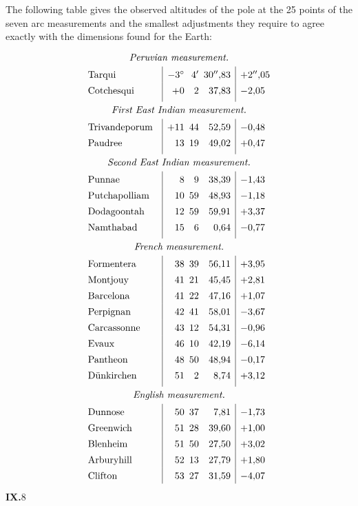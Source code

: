 The following table gives the observed altitudes of the pole at the 25 points
of the seven arc measurements and the smallest adjustments they require
to agree exactly with the dimensions found for the Earth:
\[
\renewcommand{\arraystretch}{1.38}
\begin{array}{@{}l@{\quad}|r@{\enspace}r@{\enspace}r|l@{}}
\multicolumn{5}{c}{\textit{Peruvian measurement.}}\\[.3ex]
\text{Tarqui}&-3^\circ&4'&30''{,}83&+2''{,}05\\
\text{Cotchesqui}&+0&2&37{,}83&-2{,}05\\[.8ex]
\multicolumn{5}{c}{\textit{First East Indian measurement.}}\\[.3ex]
\text{Trivandeporum}&+11&44&52{,}59&-0{,}48\\
\text{Paudree}&13&19&49{,}02&+0{,}47\\[.8ex]
\multicolumn{5}{c}{\textit{Second East Indian measurement.}}\\[.3ex]
\text{Punnae}&8&9&38{,}39&-1{,}43\\
\text{Putchapolliam}&10&59&48{,}93&-1{,}18\\
\text{Dodagoontah}&12&59&59{,}91&+3{,}37\\
\text{Namthabad}&15&6&0{,}64&-0{,}77\\[.8ex]
\multicolumn{5}{c}{\textit{French measurement.}}\\[.3ex]
\text{Formentera}&38&39&56{,}11&+3{,}95\\
\text{Montjouy}&41&21&45{,}45&+2{,}81\\
\text{Barcelona}&41&22&47{,}16&+1{,}07\\
\text{Perpignan}&42&41&58{,}01&-3{,}67\\
\text{Carcassonne}&43&12&54{,}31&-0{,}96\\
\text{Evaux}&46&10&42{,}19&-6{,}14\\
\text{Pantheon}&48&50&48{,}94&-0{,}17\\
\text{Dünkirchen}&51&2&8{,}74&+3{,}12\\[.8ex]
\multicolumn{5}{c}{\textit{English measurement.}}\\[.3ex]
\text{Dunnose}&50&37&7{,}81&-1{,}73\\
\text{Greenwich}&51&28&39{,}60&+1{,}00\\
\text{Blenheim}&51&50&27{,}50&+3{,}02\\
\text{Arburyhill}&52&13&27{,}79&+1{,}80\\
\text{Clifton}&53&27&31{,}59&-4{,}07
\end{array}
\]
\noindent\textbf{IX.}\hfill 8\hspace{.12\textwidth}\par

